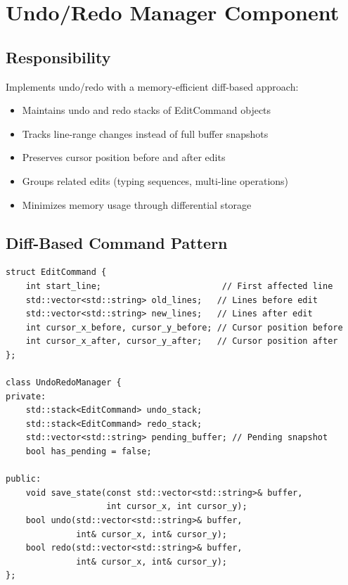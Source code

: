 \documentclass[12pt,a4paper,oneside,openany]{report}
\begin{document}
\section{Undo/Redo Manager Component}

\subsection{Responsibility}

Implements undo/redo with a memory-efficient diff-based approach:

\begin{itemize}
	\item Maintains undo and redo stacks of EditCommand objects
	\item Tracks line-range changes instead of full buffer snapshots
	\item Preserves cursor position before and after edits
	\item Groups related edits (typing sequences, multi-line operations)
	\item Minimizes memory usage through differential storage
\end{itemize}

\newpage
\subsection{Diff-Based Command Pattern}

\begin{lstlisting}
struct EditCommand {
    int start_line;                        // First affected line
    std::vector<std::string> old_lines;   // Lines before edit
    std::vector<std::string> new_lines;   // Lines after edit
    int cursor_x_before, cursor_y_before; // Cursor position before
    int cursor_x_after, cursor_y_after;   // Cursor position after
};

class UndoRedoManager {
private:
    std::stack<EditCommand> undo_stack;
    std::stack<EditCommand> redo_stack;
    std::vector<std::string> pending_buffer; // Pending snapshot
    bool has_pending = false;
    
public:
    void save_state(const std::vector<std::string>& buffer,
                    int cursor_x, int cursor_y);
    bool undo(std::vector<std::string>& buffer,
              int& cursor_x, int& cursor_y);
    bool redo(std::vector<std::string>& buffer,
              int& cursor_x, int& cursor_y);
};
\end{lstlisting}

\end{document}
